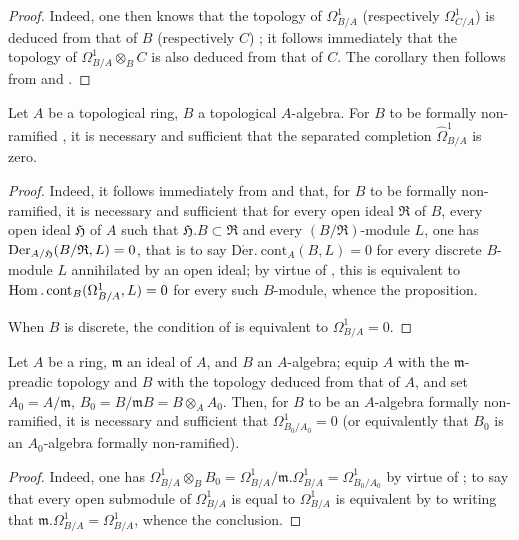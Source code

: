 \begin{proof}
Indeed, one then knows that the topology of $\Omega^1_{B/A}$ (respectively $\Omega^1_{C/A}$) is deduced from that of $B$ (respectively $C$) ; it follows immediately that the topology of $\Omega^1_{B/A}\otimes_B C$ is also deduced from that of $C$. The corollary then follows from  and .
\end{proof}

\begin{proposition}[20.7.4]
\label{0.20.7.4}
Let $A$ be a topological ring, $B$ a topological $A$-algebra.
For $B$ to be formally non-ramified , it is necessary and sufficient that the separated completion $\widehat{\Omega}^1_{B/A}$ is zero.
\end{proposition}

\begin{proof}
Indeed, it follows immediately from  and  that, for $B$ to be formally non-ramified, it is necessary and sufficient that for every open ideal $\mathfrak{R}$ of $B$, every open ideal $\mathfrak{H}$ of $A$ such that $\mathfrak{H}.B\subset\mathfrak{R}$ and every $(B/\mathfrak{R})$-module $L$, one has $\operatorname{Der}_{A/\mathfrak{H}}(B/\mathfrak{R},L)=0$, that is to say $\operatorname{D\acute{e}r.\ cont}_A(B,L)=0$ for every discrete $B$-module $L$ annihilated by an open ideal; by virtue of , this is equivalent to $\operatorname{Hom}.\operatorname{cont}_B(\Omega^1_{B/A},L)=0$ for every such $B$-module, whence the proposition.

When $B$ is discrete, the condition of  is equivalent to $\Omega^1_{B/A}=0$.
\end{proof}

\begin{corollary}[20.7.5]
\label{0.20.7.5}
Let $A$ be a ring, $\mathfrak{m}$ an ideal of $A$, and $B$ an $A$-algebra; equip $A$ with the $\mathfrak{m}$-preadic topology and $B$ with the topology deduced from that of $A$, and set $A_0=A/\mathfrak{m}$, $B_0=B/\mathfrak{m}B=B\otimes_A A_0$.
Then, for $B$ to be an $A$-algebra formally non-ramified, it is necessary and sufficient that $\Omega^1_{B_0/A_0}=0$ \textup{(}or equivalently that $B_0$ is an $A_0$-algebra formally non-ramified\textup{)}.
\end{corollary}

\begin{proof}
Indeed, one has $\Omega^1_{B/A}\otimes_B B_0=\Omega^1_{B/A}/\mathfrak{m}.\Omega^1_{B/A}=\Omega^1_{B_0/A_0}$ by virtue of ; to say that every open submodule of $\Omega^1_{B/A}$ is equal to $\Omega^1_{B/A}$ is equivalent by  to writing that $\mathfrak{m}.\Omega^1_{B/A}=\Omega^1_{B/A}$, whence the conclusion.
\end{proof}

